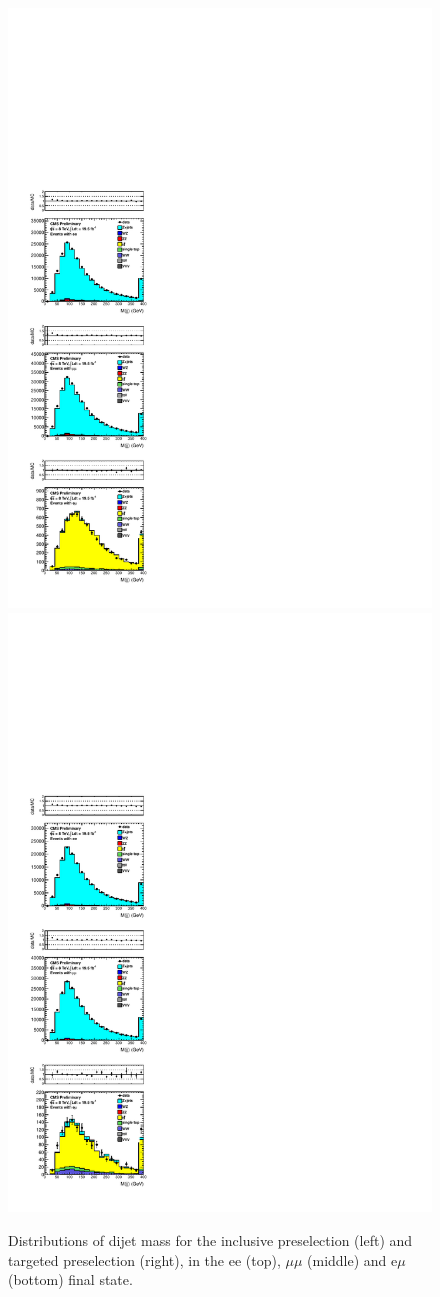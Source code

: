 \begin{figure}[!ht]
  \begin{center}
	\includegraphics[width=0.35\linewidth]{plots/mjj_inclusive_19p5fb.pdf} %
	\includegraphics[width=0.35\linewidth]{plots/mjj_targeted_19p5fb.pdf}
	\caption{
	  \label{fig:mjj}\protect 
Distributions of dijet mass for the inclusive preselection (left) and targeted preselection (right), 
in the ee (top), $\mu\mu$ (middle) and e$\mu$ (bottom) final state.
}                   
  \end{center}
\end{figure}

